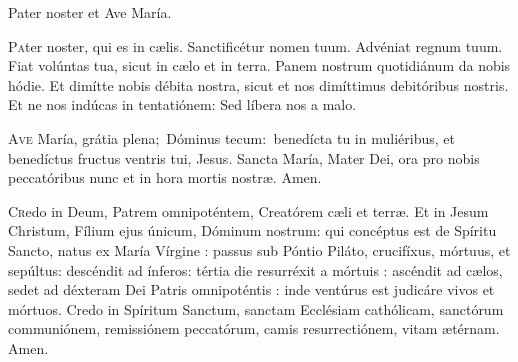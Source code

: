 \documentclass[vesperale_romanum.tex]{subfiles}
\begin{document}
Pater noster et Ave María.

\myrule


\lettrine{P}{a}ter noster, qui es in cælis. Sanctificétur nomen tuum. Advéniat regnum tuum. Fiat volúntas tua, sicut in cælo et in terra. Panem nostrum quotidiánum da nobis hódie. Et dimítte nobis débita nostra, sicut et nos dimíttimus debitóribus nostris. Et ne nos indúcas in tentatiónem: Sed líbera nos a malo. 

\lettrine{A}{ve} María, grátia plena; Dóminus tecum:  benedícta tu in muliéribus, et benedíctus fructus ventris tui, Jesus. Sancta María, Mater Dei, ora pro nobis peccatóribus nunc et in hora mortis nostræ. Amen.

\lettrine{C}{r}edo in Deum, Patrem omnipoténtem, Creatórem cæli et terræ. Et in Jesum Christum, Fílium ejus únicum, Dóminum nostrum: qui concé\-ptus est de Spíritu San\-cto, natus ex María Vírgine : passus sub Póntio Piláto, crucifíxus, mórtuus, et sepúltus: descéndit ad ínferos: tértia die resurréxit a mórtuis : ascéndit ad cælos, sedet ad déxteram Dei Patris omnipot\-éntis : inde ventúrus est judicáre vivos et mórtuos. Credo in Spíritum San\-ctum, sanctam Ecclésiam cathólicam, san\-ctórum communiónem, remissiónem peccatórum, camis resurrectiónem, vitam ætérnam. Amen.
\end{document}
